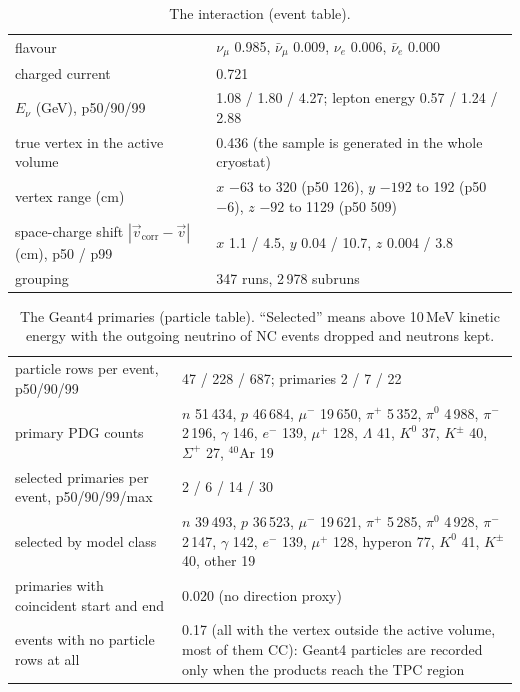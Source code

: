 \documentclass[10pt,letterpaper]{article}
\begin{document}
\begin{table}[H]\centering\small
\caption{The interaction (event table).}\label{tab:event}
\begin{tabular}{@{}>{\raggedright\arraybackslash}p{52mm}p{108mm}@{}}\toprule
flavour & $\nu_\mu$ 0.985, $\bar\nu_\mu$ 0.009, $\nu_e$ 0.006, $\bar\nu_e$ 0.000\\
charged current & 0.721\\
$E_\nu$ (GeV), p50/90/99 & 1.08 / 1.80 / 4.27; lepton energy 0.57 / 1.24 / 2.88\\
true vertex in the active volume & 0.436 (the sample is generated in the whole cryostat)\\
vertex range (cm) & $x$ $-63$ to 320 (p50 126), $y$ $-192$ to 192 (p50 $-6$), $z$ $-92$ to 1129 (p50 509)\\
space-charge shift $|\vec v_\text{corr}-\vec v|$ (cm), p50 / p99 & $x$ 1.1 / 4.5, $y$ 0.04 / 10.7, $z$ 0.004 / 3.8\\
grouping & 347 runs, 2\,978 subruns\\
\bottomrule\end{tabular}
\end{table}

\begin{table}[H]\centering\small
\caption{The Geant4 primaries (particle table). ``Selected'' means above 10\,MeV kinetic energy with the outgoing
neutrino of NC events dropped and neutrons kept.}\label{tab:particles}
\begin{tabular}{@{}>{\raggedright\arraybackslash}p{52mm}p{108mm}@{}}\toprule
particle rows per event, p50/90/99 & 47 / 228 / 687; primaries 2 / 7 / 22\\
primary PDG counts & $n$ 51\,434, $p$ 46\,684, $\mu^-$ 19\,650, $\pi^+$ 5\,352, $\pi^0$ 4\,988, $\pi^-$ 2\,196, $\gamma$ 146, $e^-$ 139, $\mu^+$ 128, $\Lambda$ 41, $K^0$ 37, $K^\pm$ 40, $\Sigma^+$ 27, $^{40}$Ar 19\\
selected primaries per event, p50/90/99/max & 2 / 6 / 14 / 30\\
selected by model class & $n$ 39\,493, $p$ 36\,523, $\mu^-$ 19\,621, $\pi^+$ 5\,285, $\pi^0$ 4\,928, $\pi^-$ 2\,147, $\gamma$ 142, $e^-$ 139, $\mu^+$ 128, hyperon 77, $K^0$ 41, $K^\pm$ 40, other 19\\
primaries with coincident start and end & 0.020 (no direction proxy)\\
events with no particle rows at all & 0.17 (all with the vertex outside the active volume, most of them CC): Geant4 particles are recorded only when the products reach the TPC region\\
\bottomrule\end{tabular}
\end{table}
\end{document}

